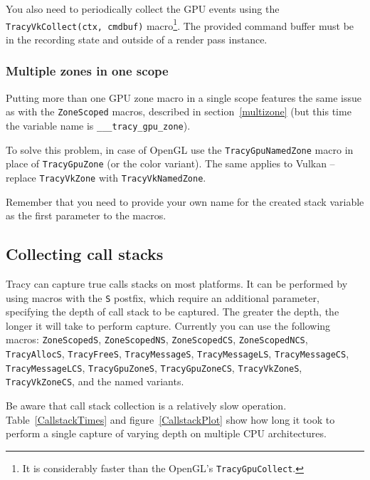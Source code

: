 \documentclass[hidelinks,titlepage,a4paper]{article}
\begin{document}
You also need to periodically collect the GPU events using the \texttt{TracyVkCollect(ctx, cmdbuf)} macro\footnote{It is considerably faster than the OpenGL's \texttt{TracyGpuCollect}.}. The provided command buffer must be in the recording state and outside of a render pass instance.

\subsubsection{Multiple zones in one scope}

Putting more than one GPU zone macro in a single scope features the same issue as with the \texttt{ZoneScoped} macros, described in section~\ref{multizone} (but this time the variable name is \texttt{\_\_\_tracy\_gpu\_zone}).

To solve this problem, in case of OpenGL use the \texttt{TracyGpuNamedZone} macro in place of \texttt{TracyGpuZone} (or the color variant). The same applies to Vulkan -- replace \texttt{TracyVkZone} with \texttt{TracyVkNamedZone}.

Remember that you need to provide your own name for the created stack variable as the first parameter to the macros.

\subsection{Collecting call stacks}
\label{collectingcallstacks}

Tracy can capture true calls stacks on most platforms. It can be performed by using macros with the \texttt{S} postfix, which require an additional parameter, specifying the depth of call stack to be captured. The greater the depth, the longer it will take to perform capture. Currently you can use the following macros: \texttt{ZoneScopedS}, \texttt{ZoneScopedNS}, \texttt{ZoneScopedCS}, \texttt{ZoneScopedNCS}, \texttt{TracyAllocS}, \texttt{TracyFreeS}, \texttt{TracyMessageS}, \texttt{TracyMessageLS}, \texttt{TracyMessageCS}, \texttt{TracyMessageLCS}, \texttt{TracyGpuZoneS}, \texttt{TracyGpuZoneCS}, \texttt{TracyVkZoneS}, \texttt{TracyVkZoneCS}, and the named variants.

Be aware that call stack collection is a relatively slow operation. Table~\ref{CallstackTimes} and figure~\ref{CallstackPlot} show how long it took to perform a single capture of varying depth on multiple CPU architectures.
\end{document}
